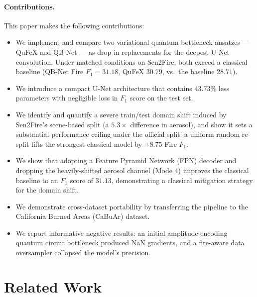 \documentclass{article}
\begin{document}
\paragraph{Contributions.} This paper makes the following contributions:
\begin{itemize}[leftmargin=2em,topsep=2pt,itemsep=2pt]
    \item We implement and compare two variational quantum bottleneck ansatzes --- QuFeX and QB-Net --- as drop-in replacements for the deepest U-Net convolution. Under matched conditions on Sen2Fire, both exceed a classical baseline (QB-Net Fire $F_1 = 31.18$, QuFeX $30.79$, vs.\ the baseline $28.71$).
    \item We introduce a compact U-Net architecture that contains $43.73\%$ less parameters with negligible loss in $F_1$ score on the test set.
    \item We identify and quantify a severe train/test domain shift induced by Sen2Fire's scene-based split (a $5.3\times$ difference in aerosol), and show it sets a substantial performance ceiling under the official split: a uniform random re-split lifts the strongest classical model by $+8.75$ Fire $F_1$.
    \item We show that adopting a Feature Pyramid Network (FPN) decoder and dropping the heavily-shifted aerosol channel (Mode 4) improves the classical baseline to an $F_1$ score of $31.13$, demonstrating a classical mitigation strategy for the domain shift.
    \item We demonstrate cross-dataset portability by transferring the pipeline to the California Burned Areas (CaBuAr) dataset.
    \item We report informative negative results: an initial amplitude-encoding quantum circuit bottleneck produced NaN gradients, and a fire-aware data oversampler collapsed the model's precision.
\end{itemize}

\section{Related Work}
\end{document}
